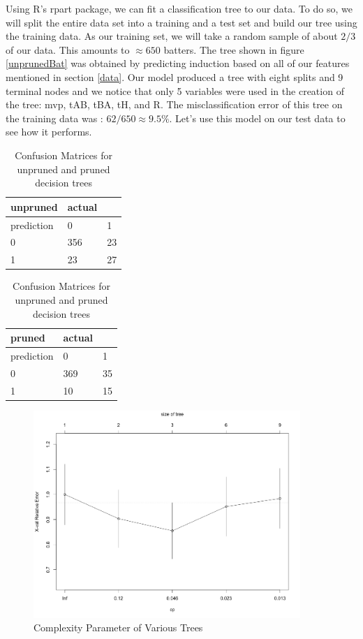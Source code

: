 \documentclass[preprint,12pt]{elsarticle}
\begin{document}
Using R's rpart package, we can fit a classification tree to our data. To do so, we will split the entire data set into a training and a test set and build our tree using the training data. As our training set, we will take a random sample of about $2/3$ of our data. This amounts to $\approx 650$ batters. The tree shown in figure \ref{unprunedBat} was obtained by predicting induction based on all of our features mentioned in section \ref{data}. Our model produced a tree with eight splits and 9 terminal nodes and we notice that only 5 variables were used in the creation of the tree: mvp, tAB, tBA, tH, and R. The misclassification error of this tree on the training data was : $62/650 \approx 9.5\%$. Let's use this model on our test data to see how it performs.


\begin{table}
\centering
\begin{tabular}{|l |l l|}
\hline
 unpruned &  actual & \\
\hline
prediction & 0 & 1 \\
0 & 356 & 23 \\
1 & 23 & 27 \\
\hline
\end{tabular}
\quad
\begin{tabular}{|l |l l|}
\hline
 pruned &  actual & \\
\hline
prediction & 0 & 1 \\
0 & 369 & 35 \\
1 & 10 & 15 \\
\hline
\end{tabular}
\caption{Confusion Matrices for unpruned and pruned decision trees}
\label{conf}
\end{table}

\begin{figure}[h]
       \centering 
       \includegraphics[width=0.9\textwidth]{PlotCP}
       \caption{Complexity Parameter of Various Trees}
       \label{CPlot}
 \end{figure}
\end{document}
